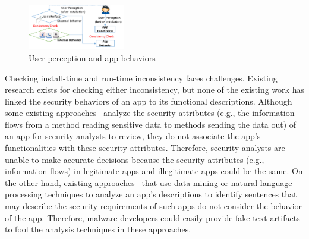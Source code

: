  \begin{figure}[H]%
 \centering
\includegraphics[width=0.38\textwidth]{Problem.png}%
\caption{User perception and app behaviors
 }%
\label{fig:Problem}%
\end{figure}


Checking install-time and run-time inconsistency faces challenges.
Existing research exists for checking either inconsistency,
but none of the existing work has linked the security behaviors of an app to its
functional descriptions.
Although some existing approaches~\cite{felt2011survey,zhou2012hey,peng2012using,hornyack2011these,enck2010taintdroid,grace2012riskranker,zhou2012dissecting} analyze the security attributes (e.g., the information flows from a method reading sensitive data to methods sending the data out) of an app for security analysts to review, they do not associate the app's functionalities with these security attributes.
Therefore, security analysts are unable to make accurate decisions because the security attributes (e.g., information flows) in legitimate apps and illegitimate apps could be the same.
On the other hand, existing approaches~\cite{harman2012app, whyper} that use data mining or natural language processing techniques to analyze an app's descriptions to identify sentences that may describe the security requirements of such apps do not consider the behavior of the app. Therefore, malware developers could easily provide fake text artifacts to fool the analysis techniques in these approaches.

